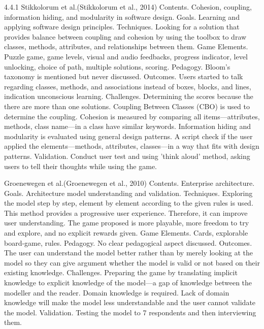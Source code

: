 \documentclass[runningheads,a4paper]{llncs}
\begin{document}
4.4.1 Stikkolorum et al.(Stikkolorum et al., 2014)
Contents. Cohesion, coupling, information hiding, and modularity in software design.
Goals. Learning and applying software design principles.
Techniques. Looking for a solution that provides balance between coupling and cohesion by using the toolbox to draw classes, methods, attributes, and relationships between them.
Game Elements. Puzzle game, game levels, visual and audio feedbacks, progress indicator, level unlocking, choice of path, multiple solutions, scoring.
Pedagogy. Bloom’s taxonomy is mentioned but never discussed.
Outcomes. Users started to talk regarding classes, methods, and associations instead of boxes, blocks, and lines, indication unconscious learning.
Challenges. Determining the scores because the there are more than one solutions. Coupling Between Classes (CBO) is used to determine the coupling. Cohesion is measured by comparing all items—attributes, methods, class name—in a class have similar keywords. Information hiding and modularity is evaluated using general design patterns. A script check if the user applied the elements—methods, attributes, classes—in a way that fits with design patterns.
Validation. Conduct user test and using 'think aloud' method, asking users to tell their thoughts while using the game. 

Groenewegen et al.(Groenewegen et al., 2010)\cite{Groenewegen2010}
Contents. Enterprise architecture.
Goals. Architecture model understanding and validation.
Techniques. Exploring the model step by step, element by element according to the given rules is used. This method provides a progressive user experience. Therefore, it can improve user understanding. The game proposed is more playable, more freedom to try and explore, and no explicit rewards given. 
Game Elements. Cards, explorable board-game, rules. 
Pedagogy. No clear pedagogical aspect discussed.
Outcomes. The user can understand the model better rather than by merely looking at the model so they can give argument whether the model is valid or not based on their existing knowledge.
Challenges. Preparing the game by translating implicit knowledge to explicit knowledge of the model—a gap of knowledge between the modeller and the reader. Domain knowledge is required. Lack of domain knowledge will make the model less understandable and the user cannot validate the model.
Validation. Testing the model to 7 respondents and then interviewing them. 
\end{document}

